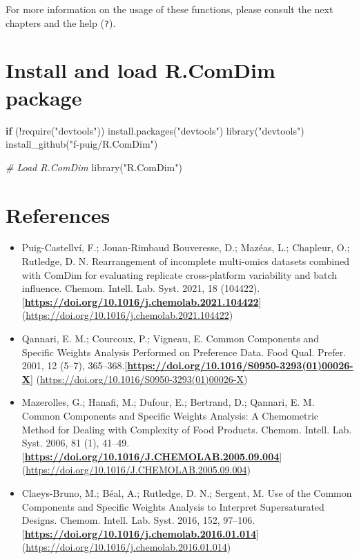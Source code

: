 \documentclass[
]{book}
\newenvironment{Shaded}{\begin{snugshade}}{\end{snugshade}}
\newcommand{\CommentTok}[1]{\textcolor[rgb]{0.56,0.35,0.01}{\textit{#1}}}
\newcommand{\ControlFlowTok}[1]{\textcolor[rgb]{0.13,0.29,0.53}{\textbf{#1}}}
\newcommand{\FunctionTok}[1]{\textcolor[rgb]{0.00,0.00,0.00}{#1}}
\newcommand{\NormalTok}[1]{#1}
\newcommand{\SpecialCharTok}[1]{\textcolor[rgb]{0.00,0.00,0.00}{#1}}
\newcommand{\StringTok}[1]{\textcolor[rgb]{0.31,0.60,0.02}{#1}}
\providecommand{\tightlist}{%
  \setlength{\itemsep}{0pt}\setlength{\parskip}{0pt}}
\begin{document}
For more information on the usage of these functions, please consult the
next chapters and the help (\texttt{?}).

\hypertarget{install}{%
\section{Install and load R.ComDim package}\label{install}}

\begin{Shaded}
\begin{Highlighting}[]
  \ControlFlowTok{if}\NormalTok{ (}\SpecialCharTok{!}\FunctionTok{require}\NormalTok{(}\StringTok{"devtools"}\NormalTok{)) }\FunctionTok{install.packages}\NormalTok{(}\StringTok{"devtools"}\NormalTok{)}
  \FunctionTok{library}\NormalTok{(}\StringTok{"devtools"}\NormalTok{)}
  \FunctionTok{install\_github}\NormalTok{(}\StringTok{"f{-}puig/R.ComDim"}\NormalTok{)}
  
  \CommentTok{\# Load R.ComDim}
  \FunctionTok{library}\NormalTok{(}\StringTok{"R.ComDim"}\NormalTok{)}
\end{Highlighting}
\end{Shaded}

\hypertarget{references}{%
\section{References}\label{references}}

\begin{itemize}
\tightlist
\item
  Puig-Castellví, F.; Jouan-Rimbaud Bouveresse, D.; Mazéas, L.; Chapleur, O.;
  Rutledge, D. N. Rearrangement of incomplete multi-omics datasets combined with
  ComDim for evaluating replicate cross-platform variability and batch influence.
  Chemom. Intell. Lab. Syst. 2021, 18 (104422).
  {[}\textbf{\url{https://doi.org/10.1016/j.chemolab.2021.104422}}{]}
  (\url{https://doi.org/10.1016/j.chemolab.2021.104422})
\item
  Qannari, E. M.; Courcoux, P.; Vigneau, E. Common Components and Specific
  Weights Analysis Performed on Preference Data. Food Qual. Prefer. 2001, 12
  (5--7), 365--368.{[}\textbf{\url{https://doi.org/10.1016/S0950-3293(01)00026-X}}{]}
  (\url{https://doi.org/10.1016/S0950-3293(01)00026-X})
\item
  Mazerolles, G.; Hanafi, M.; Dufour, E.; Bertrand, D.; Qannari, E. M. Common
  Components and Specific Weights Analysis: A Chemometric Method for Dealing with
  Complexity of Food Products. Chemom. Intell. Lab. Syst. 2006, 81 (1), 41--49. {[}\textbf{\url{https://doi.org/10.1016/J.CHEMOLAB.2005.09.004}}{]}
  (\url{https://doi.org/10.1016/J.CHEMOLAB.2005.09.004})
\item
  Claeys-Bruno, M.; Béal, A.; Rutledge, D. N.; Sergent, M. Use of the Common
  Components and Specific Weights Analysis to Interpret Supersaturated Designs.
  Chemom. Intell. Lab. Syst. 2016, 152, 97--106.
  {[}\textbf{\url{https://doi.org/10.1016/j.chemolab.2016.01.014}}{]}
  (\url{https://doi.org/10.1016/j.chemolab.2016.01.014})
\end{itemize}
\end{document}
